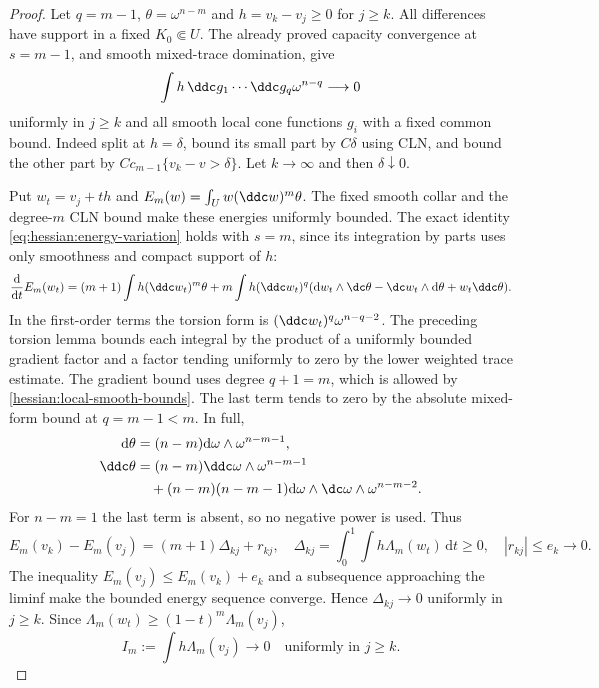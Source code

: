 \begin{proof}
Let $q=m-1$, $\theta=\omega^{n-m}$ and $h=v_k-v_j\geq0$ for
$j\geq k$. All differences have support in a fixed $K_0\Subset U$.
The already proved capacity convergence at $s=m-1$, and smooth
mixed-trace domination, give
\[
 \int h\,\ddc g_1\cdots\ddc g_q\omega^{n-q}\longrightarrow0
\]
uniformly in $j\geq k$ and all smooth local cone functions $g_i$
with a fixed common bound. Indeed split at $h=\delta$, bound its
small part by $C\delta$ using CLN, and bound the other part by
$C c_{m-1}\{v_k-v>\delta\}$. Let $k\to\infty$ and then
$\delta\downarrow0$.

Put $w_t=v_j+t h$ and $E_m(w)=\int_U w(\ddc w)^m\theta$.
The fixed smooth collar and the degree-$m$ CLN bound make these
energies uniformly bounded. The exact identity
\eqref{eq:hessian:energy-variation} holds with $s=m$, since its
integration by parts uses only smoothness and compact support of $h$:
\[
 \frac{\mathrm d}{\mathrm dt}E_m(w_t)
 =(m+1)\int h(\ddc w_t)^m\theta
 +m\int h(\ddc w_t)^q
       (\mathrm dw_t\wedge\dc\theta
          -\dc w_t\wedge\mathrm d\theta+w_t\ddc\theta).
\]
In the first-order terms the torsion form is
$(\ddc w_t)^q\omega^{n-q-2}$. The preceding torsion lemma bounds
each integral by the product of a uniformly bounded gradient
factor and a factor tending uniformly to zero by the lower weighted
trace estimate. The gradient bound uses degree $q+1=m$, which is
allowed by \cref{hessian:local-smooth-bounds}. The last term tends
to zero by the absolute mixed-form bound at $q=m-1<m$.
In full,
\[
 \begin{aligned}
 \mathrm d\theta&=(n-m)\mathrm d\omega\wedge\omega^{n-m-1},\\
 \ddc\theta&=(n-m)\ddc\omega\wedge\omega^{n-m-1}\\
 &\quad+(n-m)(n-m-1)\mathrm d\omega\wedge\dc\omega
                                              \wedge\omega^{n-m-2}.
 \end{aligned}
\]
For $n-m=1$ the last term is absent, so no negative power is used.
Thus
\[
 E_m(v_k)-E_m(v_j)=(m+1)\Delta_{kj}+r_{kj},\quad
 \Delta_{kj}=\int_0^1\int h\Lambda_m(w_t)\,\mathrm dt\geq0,
 \quad |r_{kj}|\leq e_k\longrightarrow0.
\]
The inequality $E_m(v_j)\leq E_m(v_k)+e_k$ and a subsequence
approaching the liminf make the bounded energy sequence converge.
Hence $\Delta_{kj}\to0$ uniformly in $j\geq k$.
Since $\Lambda_m(w_t)\geq(1-t)^m\Lambda_m(v_j)$,
\[
 I_m:=\int h\Lambda_m(v_j)\longrightarrow0
                                      \quad\text{uniformly in }j\geq k.
\]


\end{proof}

